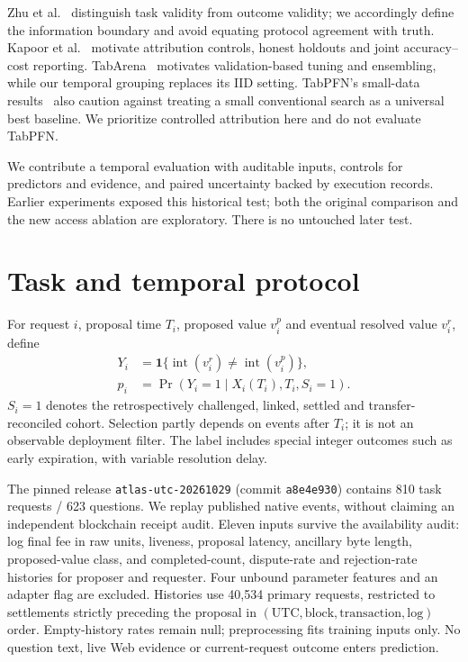 \documentclass[sigconf,anonymous,review]{acmart}
\begin{document}
Zhu et al.~\cite{zhu2025} distinguish task validity from outcome validity; we accordingly define the information boundary and avoid equating protocol agreement with truth. Kapoor et al.~\cite{kapoor2025} motivate attribution controls, honest holdouts and joint accuracy--cost reporting. TabArena~\cite{erickson2025tabarena} motivates validation-based tuning and ensembling, while our temporal grouping replaces its IID setting. TabPFN's small-data results~\cite{hollmann2025} also caution against treating a small conventional search as a universal best baseline. We prioritize controlled attribution here and do not evaluate TabPFN.

We contribute a temporal evaluation with auditable inputs, controls for predictors and evidence, and paired uncertainty backed by execution records. Earlier experiments exposed this historical test; both the original comparison and the new access ablation are exploratory. There is no untouched later test.

\section{Task and temporal protocol}
For request $i$, proposal time $T_i$, proposed value $v_i^p$ and eventual resolved value $v_i^r$, define
\begin{equation}
\begin{aligned}
Y_i&=\mathbf1\{\operatorname{int}(v_i^r)\ne\operatorname{int}(v_i^p)\},\\
p_i&=\Pr(Y_i=1\mid X_i(T_i),T_i,S_i=1).
\end{aligned}
\end{equation}
$S_i=1$ denotes the retrospectively challenged, linked, settled and transfer-reconciled cohort. Selection partly depends on events after $T_i$; it is not an observable deployment filter. The label includes special integer outcomes such as early expiration, with variable resolution delay.

The pinned release \texttt{atlas-utc-20261029} (commit \texttt{a8e4e930}) contains 810 task requests / 623 questions. We replay published native events, without claiming an independent blockchain receipt audit. Eleven inputs survive the availability audit: log final fee in raw units, liveness, proposal latency, ancillary byte length, proposed-value class, and completed-count, dispute-rate and rejection-rate histories for proposer and requester. Four unbound parameter features and an adapter flag are excluded. Histories use 40,534 primary requests, restricted to settlements strictly preceding the proposal in $(\mathrm{UTC},\mathrm{block},\mathrm{transaction},\mathrm{log})$ order. Empty-history rates remain null; preprocessing fits training inputs only. No question text, live Web evidence or current-request outcome enters prediction.
\end{document}
